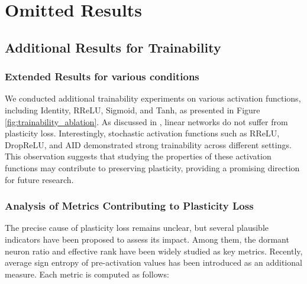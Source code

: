 

\newpage

\section{Omitted Results}
\subsection{Additional Results for Trainability}
\label{app:additional_results_trainability}
\subsubsection{Extended Results for various conditions}
\label{app:extended_results_trainability}



We conducted additional trainability experiments on various activation functions, including Identity, RReLU, Sigmoid, and Tanh, as presented in Figure \ref{fig:trainability_ablation}. As discussed in \citet{dohare2024loss, lewandowski2024plastic}, linear networks do not suffer from plasticity loss. Interestingly, stochastic activation functions such as RReLU, DropReLU, and AID demonstrated strong trainability across different settings. This observation suggests that studying the properties of these activation functions may contribute to preserving plasticity, providing a promising direction for future research.

\newpage
\subsubsection{Analysis of Metrics Contributing to Plasticity Loss}
\label{app:metrics_pl}





The precise cause of plasticity loss remains unclear, but several plausible indicators have been proposed to assess its impact. Among them, the dormant neuron ratio \cite{sokar2023dormant} and effective rank \cite{kumar2020implicit, lyle2022understanding} have been widely studied as key metrics. Recently, average sign entropy \cite{lewandowski2024plastic} of pre-activation values has been introduced as an additional measure. Each metric is computed as follows:

